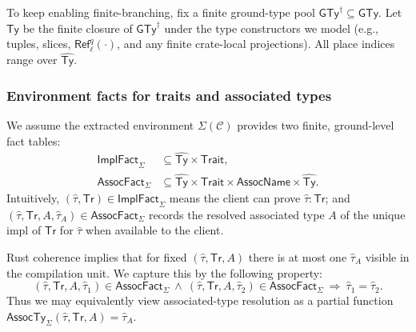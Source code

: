 \documentclass[runningheads]{llncs}
\begin{document}
To keep enabling finite-branching, fix a finite ground-type pool $\mathsf{GTy}^{\dagger}\subseteq \mathsf{GTy}$. Let $\widehat{\mathsf{Ty}}$ be the finite closure of $\mathsf{GTy}^{\dagger}$ under the type constructors we model (e.g., tuples, slices, $\mathsf{Ref}^q_{\ell}(\cdot)$, and any finite crate-local projections). All place indices range over $\widehat{\mathsf{Ty}}$.

\subsubsection{Environment facts for traits and associated types}
\label{sec:method:assocfacts}

We assume the extracted environment $\Sigma(\mathcal{C})$ provides two finite, ground-level fact tables:
\begin{align*}
\mathsf{ImplFact}_{\Sigma} &\subseteq \widehat{\mathsf{Ty}}\times \mathsf{Trait},\\
\mathsf{AssocFact}_{\Sigma} &\subseteq \widehat{\mathsf{Ty}}\times \mathsf{Trait}\times \mathsf{AssocName}\times \widehat{\mathsf{Ty}}.
\end{align*}
Intuitively, $(\hat\tau,\mathsf{Tr})\in \mathsf{ImplFact}_{\Sigma}$ means the client can prove $\hat\tau:\mathsf{Tr}$;
and $(\hat\tau,\mathsf{Tr},A,\hat\tau_A)\in \mathsf{AssocFact}_{\Sigma}$ records the resolved associated type
$A$ of the unique impl of $\mathsf{Tr}$ for $\hat\tau$ when available to the client.

Rust coherence implies that for fixed $(\hat\tau,\mathsf{Tr},A)$ there is at most one $\hat\tau_A$ visible in the compilation unit. We capture this by the following property:
\begin{equation*}
    (\hat\tau,\mathsf{Tr},A,\hat\tau_1)\in \mathsf{AssocFact}_{\Sigma}\ \wedge\
(\hat\tau,\mathsf{Tr},A,\hat\tau_2)\in \mathsf{AssocFact}_{\Sigma}
\ \Rightarrow\ \hat\tau_1=\hat\tau_2.
\end{equation*}
Thus we may equivalently view associated-type resolution as a partial function
$\mathsf{AssocTy}_{\Sigma}(\hat\tau,\mathsf{Tr},A)=\hat\tau_A$.
\end{document}
